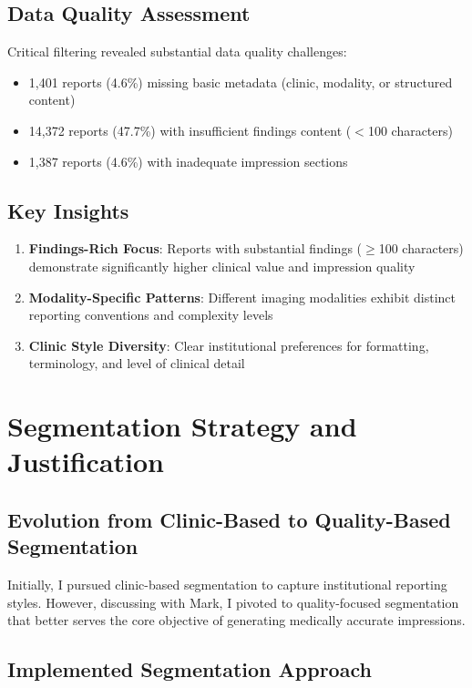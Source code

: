 \documentclass[11pt,letterpaper]{article}
\begin{document}
\subsection{Data Quality Assessment}
Critical filtering revealed substantial data quality challenges:
\begin{itemize}
    \item 1,401 reports (4.6\%) missing basic metadata (clinic, modality, or structured content)
    \item 14,372 reports (47.7\%) with insufficient findings content ($<$100 characters)
    \item 1,387 reports (4.6\%) with inadequate impression sections
\end{itemize}

\subsection{Key Insights}
\begin{enumerate}
    \item \textbf{Findings-Rich Focus}: Reports with substantial findings ($\geq$100 characters) demonstrate significantly higher clinical value and impression quality
    \item \textbf{Modality-Specific Patterns}: Different imaging modalities exhibit distinct reporting conventions and complexity levels
    \item \textbf{Clinic Style Diversity}: Clear institutional preferences for formatting, terminology, and level of clinical detail
\end{enumerate}

\section{Segmentation Strategy and Justification}

\subsection{Evolution from Clinic-Based to Quality-Based Segmentation}

Initially, I pursued clinic-based segmentation to capture institutional reporting styles. However, discussing with Mark, I pivoted to quality-focused segmentation that better serves the core objective of generating medically accurate impressions.

\subsection{Implemented Segmentation Approach}
\end{document}
